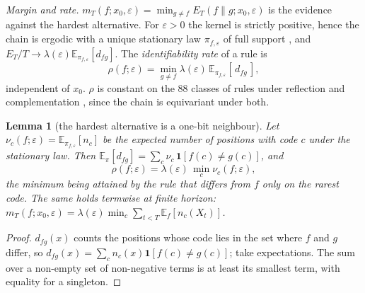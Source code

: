 \documentclass[11pt,a4paper]{article}
\newtheorem{lemma}{Lemma}
\theoremstyle{remark}
\newcommand{\eps}{\varepsilon}
\newcommand{\E}{\mathbb{E}}
\begin{document}
\emph{Margin and rate.} $m_T(f;x_0,\eps)=\min_{g\ne f}E_T(f\|g;x_0,\eps)$ is the evidence against the hardest alternative. For $\eps>0$ the kernel is strictly positive, hence the chain is ergodic with a unique stationary law $\pi_{f,\eps}$ of full support \citep{Norris}, and $E_T/T\to\lambda(\eps)\E_{\pi_{f,\eps}}[d_{fg}]$. The \emph{identifiability rate} of a rule is
\[
\rho(f;\eps)=\min_{g\ne f}\lambda(\eps)\,\E_{\pi_{f,\eps}}[\,d_{fg}\,],
\]
independent of $x_0$. $\rho$ is constant on the $88$ classes of rules under reflection and complementation \citep{LiPackard1990}, since the chain is equivariant under both.

\begin{lemma}[the hardest alternative is a one-bit neighbour]\label{lem:onebit}
Let $\nu_c(f;\eps)=\E_{\pi_{f,\eps}}[n_c]$ be the expected number of positions with code $c$ under the stationary law. Then $\E_\pi[d_{fg}]=\sum_c\nu_c\,\mathbf 1[f(c)\ne g(c)]$, and
\[
\rho(f;\eps)=\lambda(\eps)\,\min_{c}\nu_c(f;\eps),
\]
the minimum being attained by the rule that differs from $f$ only on the rarest code. The same holds termwise at finite horizon: $m_T(f;x_0,\eps)=\lambda(\eps)\min_c\sum_{t<T}\E_f[n_c(X_t)]$.
\end{lemma}
\begin{proof}
$d_{fg}(x)$ counts the positions whose code lies in the set where $f$ and $g$ differ, so $d_{fg}(x)=\sum_c n_c(x)\mathbf 1[f(c)\ne g(c)]$; take expectations. The sum over a non-empty set of non-negative terms is at least its smallest term, with equality for a singleton.
\end{proof}
\end{document}

